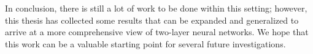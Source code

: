 In conclusion, there is still a lot of work to be done within this setting; however, this thesis has collected some results that can be expanded and generalized to arrive at a more comprehensive view of two-layer neural networks. We hope that this work can be a valuable starting point for several future investigations.